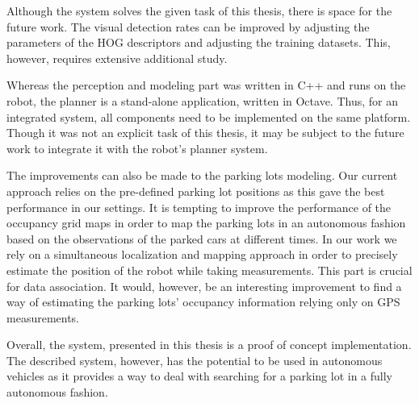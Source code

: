     Although the system solves the given task of this thesis, there is space
    for the future work. The visual detection rates can be improved by
    adjusting the parameters of the HOG descriptors and adjusting the training
    datasets. This, however, requires extensive additional study.

    Whereas the perception and modeling part was written in C++ and runs on
    the robot, the planner is a stand-alone application, written in Octave.
    Thus, for an integrated system, all components need to be implemented on
    the same platform. Though it was not an explicit task of this thesis, it
    may be subject to the future work to integrate it with the robot's planner
    system.

    The improvements can also be made to the parking lots modeling. Our
    current approach relies on the pre-defined parking lot positions as this
    gave the best performance in our settings. It is tempting to improve the
    performance of the occupancy grid maps in order to map the parking lots in
    an autonomous fashion based on the observations of the parked cars at
    different times. In our work we rely on a simultaneous localization and
    mapping approach in order to precisely estimate the position of the robot
    while taking measurements. This part is crucial for data association. It
    would, however, be an interesting improvement to find a way of estimating
    the parking lots' occupancy information relying only on GPS measurements.

    Overall, the system, presented in this thesis is a proof of concept
    implementation. The described system, however, has the potential to be
    used in autonomous vehicles as it provides a way to deal with searching
    for a parking lot in a fully autonomous fashion.

